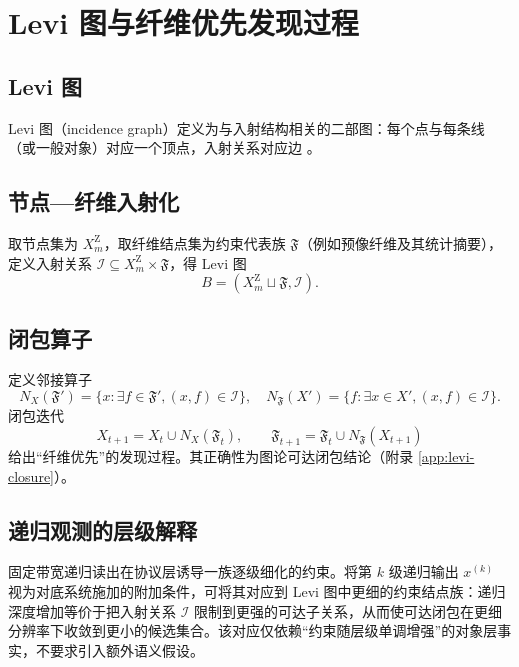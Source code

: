 \section{Levi 图与纤维优先发现过程}

\subsection{Levi 图}

Levi 图（incidence graph）定义为与入射结构相关的二部图：每个点与每条线（或一般对象）对应一个顶点，入射关系对应边 \cite{WikipediaLeviGraph}。

\subsection{节点—纤维入射化}

取节点集为 $X_m^{\mathrm Z}$，取纤维结点集为约束代表族 $\mathfrak{F}$（例如预像纤维及其统计摘要），定义入射关系 $\mathcal{I}\subseteq X_m^{\mathrm Z}\times\mathfrak{F}$，得 Levi 图
\[
B=(X_m^{\mathrm Z}\sqcup\mathfrak{F},\mathcal{I}).
\]

\subsection{闭包算子}

定义邻接算子
\[
N_X(\mathfrak{F}')=\{x:\exists f\in\mathfrak{F}',(x,f)\in\mathcal{I}\},\quad
N_{\mathfrak{F}}(X')=\{f:\exists x\in X',(x,f)\in\mathcal{I}\}.
\]
闭包迭代
\[
X_{t+1}=X_t\cup N_X(\mathfrak{F}_t),\qquad
\mathfrak{F}_{t+1}=\mathfrak{F}_t\cup N_{\mathfrak{F}}(X_{t+1})
\]
给出“纤维优先”的发现过程。其正确性为图论可达闭包结论（附录 \ref{app:levi-closure}）。

\subsection{递归观测的层级解释}
固定带宽递归读出在协议层诱导一族逐级细化的约束。将第 $k$ 级递归输出 $x^{(k)}$ 视为对底系统施加的附加条件，可将其对应到 Levi 图中更细的约束结点族：递归深度增加等价于把入射关系 $\mathcal{I}$ 限制到更强的可达子关系，从而使可达闭包在更细分辨率下收敛到更小的候选集合。该对应仅依赖“约束随层级单调增强”的对象层事实，不要求引入额外语义假设。
